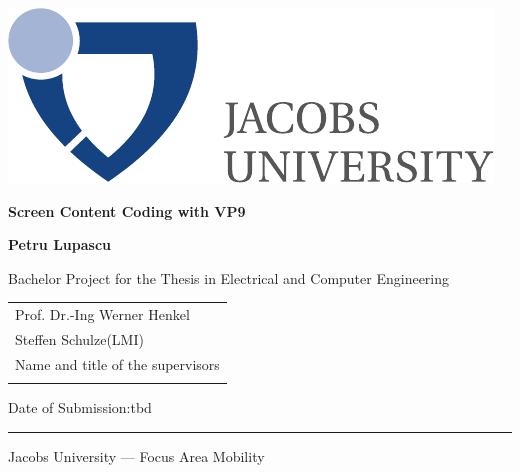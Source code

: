 \documentclass[a4paper,11pt,oneside]{article}
\newcommand{\myname}{Petru Lupascu}
\newcommand{\mytitle}{Screen Content Coding with VP9}
\newcommand{\mysupervisor}{Prof. Dr.-Ing Werner Henkel}
\newcommand{\myssupervisor}{Steffen Schulze(LMI)}
\begin{document}

\thispagestyle{empty}

\begin{flushright}
  \includegraphics[scale=0.7]{../figures/bsc-logo.pdf}
\end{flushright}
\vspace{20mm}
\begin{center}
  \huge
  \textbf{\mytitle}
\end{center}
\vspace*{4mm}
\begin{center}
  
\end{center}
\vspace*{4mm}
\begin{center}
  \Large
  \textbf{\myname}
\end{center}
\vspace*{20mm}
\begin{center}
  \large
  Bachelor Project for the Thesis in Electrical and Computer Engineering
\end{center}
\vfill
\begin{flushright}
  \large
  \begin{tabular}{l}
    \mysupervisor                     \\
    \myssupervisor                    \\
    \hline
    Name and title of the supervisors \\
    \\
  \end{tabular}
\end{flushright}
\vspace*{8mm}
\begin{flushleft}
  \large
  Date of Submission:tbd \\
  \rule{\textwidth}{1pt}
\end{flushleft}
\begin{center}
  \Large Jacobs University --- Focus Area Mobility
\end{center}
\end{document}
